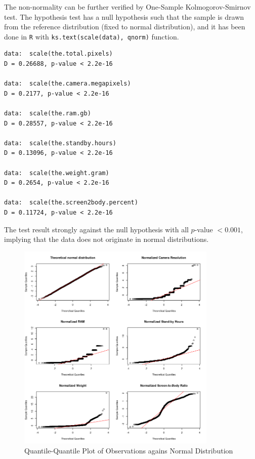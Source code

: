 \documentclass[utf8,english]{gradu3}
\begin{document}
The non-normality can be further verified by One-Sample Kolmogorov-Smirnov test. The hypothesis test has a null hypothesis such that the sample is drawn from the reference distribution (fixed to normal distribution), and it has been done in \texttt{R} with \texttt{ks.text(scale(data), qnorm)} function. 

\begin{verbatim}
data:  scale(the.total.pixels)
D = 0.26688, p-value < 2.2e-16

data:  scale(the.camera.megapixels)
D = 0.2177, p-value < 2.2e-16

data:  scale(the.ram.gb)
D = 0.28557, p-value < 2.2e-16

data:  scale(the.standby.hours)
D = 0.13096, p-value < 2.2e-16

data:  scale(the.weight.gram)
D = 0.2654, p-value < 2.2e-16

data:  scale(the.screen2body.percent)
D = 0.11724, p-value < 2.2e-16
\end{verbatim}

The test result strongly against the null hypothesis with all $p$-value $< 0.001$, implying that the data does not originate in normal distributions.

\begin{figure}[htb]
    \centering
    \includegraphics[width=0.85\textwidth]{qqplots.png}
    \caption{Quantile-Quantile Plot of Observations agains Normal Distribution}
    \label{fig:qqplots}
\end{figure}
\end{document}
